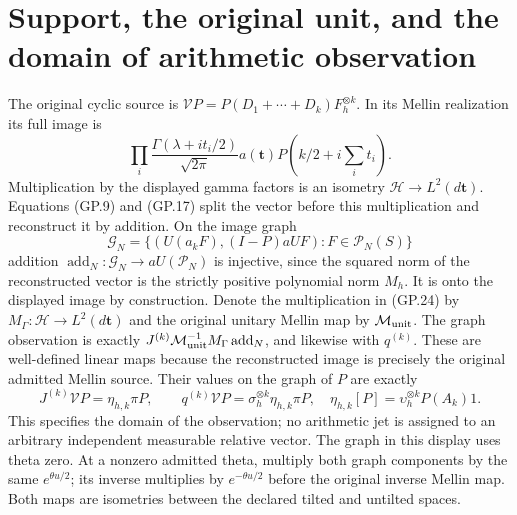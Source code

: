 \documentclass[11pt]{article}
\newcommand{\HH}{\mathcal H}
\newcommand{\PP}{\mathcal P}
\newcommand{\V}{\mathcal V}
\begin{document}
\section{Support, the original unit, and the domain of arithmetic observation}
The original cyclic source is
$\V P=P(D_1+\cdots+D_k)F_h^{\otimes k}$. In its Mellin realization
its full image is
\begin{equation}
 \prod_i\frac{\Gamma(\lambda+it_i/2)}{\sqrt{2\pi}}
                  a(\mathbf t)P(k/2+i\textstyle\sum_i t_i).
 \tag{GP.24}
\end{equation}
Multiplication by the displayed gamma factors is an isometry
$\HH\to L^2(d\mathbf t)$. Equations (GP.9) and (GP.17) split
the vector before this multiplication and reconstruct it by addition.
On the image graph
\[
 \mathcal G_N=\{(U(a_kF), (I-P)aUF):F\in\PP_N(S)\}
\]
addition $\operatorname{add}_N:\mathcal G_N\to aU(\PP_N)$ is
injective, since the squared norm of the reconstructed vector is the
strictly positive polynomial norm $M_h$. It is onto the displayed
image by construction. Denote the multiplication in (GP.24) by
$M_\Gamma:\HH\to L^2(d\mathbf t)$ and the original unitary Mellin
map by $\mathcal M_{\rm unit}$. The graph observation is exactly
$J^{(k)}\mathcal M_{\rm unit}^{-1}M_\Gamma\operatorname{add}_N$,
and likewise with $q^{(k)}$. These are well-defined linear maps
because the reconstructed image is precisely the original admitted
Mellin source. Their values on the graph of $P$ are exactly
\begin{equation}
 J^{(k)}\V P=\eta_{h,k}\pi P,\qquad
 q^{(k)}\V P=\sigma_h^{\otimes k}\eta_{h,k}\pi P,
 \quad\eta_{h,k}[P]=\upsilon_h^{\otimes k}P(A_k)1.
 \tag{GP.25}
\end{equation}
This specifies the domain of the observation; no arithmetic jet is
assigned to an arbitrary independent measurable relative vector.
The graph in this display uses theta zero. At a nonzero admitted theta,
multiply both graph components by the same $e^{\theta u/2}$; its inverse
multiplies by $e^{-\theta u/2}$ before the original inverse Mellin map.
Both maps are isometries between the declared tilted and untilted spaces.
\end{document}

